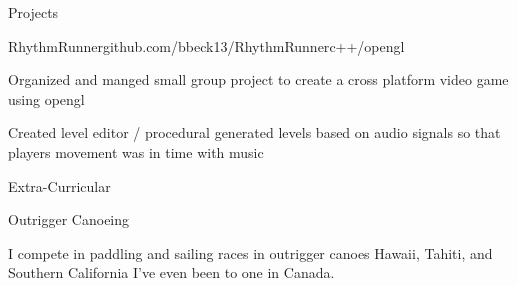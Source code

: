 \documentclass{resume} %
\begin{document}
\begin{rSection}{Projects} \itemsep -2pt
\begin{rSubsection}{RhythmRunner}{github.com/bbeck13/RhythmRunner}{c++/opengl}{}
\item Organized and manged small group project to create a cross platform video game using opengl
\item Created level editor / procedural generated levels based on audio signals so that players movement was in time with music

\end{rSubsection}

\end{rSection}

\begin{rSection}{Extra-Curricular}
\begin{rSubsection} {Outrigger Canoeing}{}{}{}
\item I compete in paddling and sailing races in outrigger canoes Hawaii, Tahiti, and Southern California I've even been to one in Canada. 
\end{rSubsection}
\end{rSection}
\end{document}
